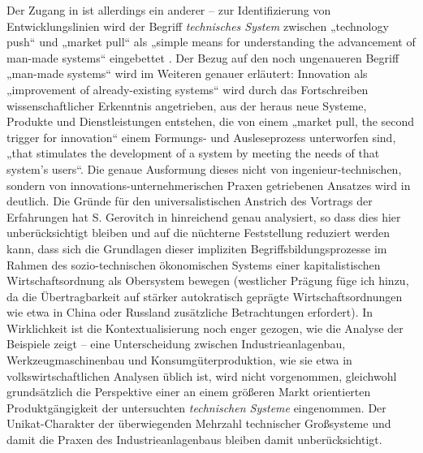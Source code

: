 \documentclass[12pt,a4paper]{article}
\begin{document}
Der Zugang in \cite{TESE2018} ist allerdings ein anderer -- zur
Identifizierung von Entwicklungslinien wird der Begriff \emph{technisches
  System} zwischen „technology push“ und „market pull“ als „simple means for
understanding the advancement of man-made systems“ eingebettet
\cite[S. 1]{TESE2018}. Der Bezug auf den noch ungenaueren Begriff „man-made
systems“ wird im Weiteren genauer erläutert: Innovation als „improvement of
already-existing systems“ wird durch das Fortschreiben wissenschaftlicher
Erkenntnis angetrieben, aus der heraus neue Systeme, Produkte und
Dienstleistungen entstehen, die von einem „market pull, the second trigger for
innovation“ einem Formungs- und Ausleseprozess unterworfen sind, „that
stimulates the development of a system by meeting the needs of that system's
users“.  Die genaue Ausformung dieses nicht von ingenieur-technischen, sondern
von innovations-unternehmerischen Praxen getriebenen Ansatzes wird in
\cite[Kap. 3]{TESE2018} deutlich.  Die Gründe für den universalistischen
Anstrich des Vortrags der Erfahrungen hat S. Gerovitch in \cite{Gerovitch1996}
hinreichend genau analysiert, so dass dies hier unberücksichtigt bleiben und
auf die nüchterne Feststellung reduziert werden kann, dass sich die Grundlagen
dieser impliziten Begriffsbildungsprozesse im Rahmen des sozio-technischen
ökonomischen Systems einer kapitalistischen Wirtschaftsordnung als Obersystem
bewegen (westlicher Prägung füge ich hinzu, da die Übertragbarkeit auf stärker
autokratisch geprägte Wirtschaftsordnungen wie etwa in China oder Russland
zusätzliche Betrachtungen erfordert).  In Wirklichkeit ist die
Kontextualisierung noch enger gezogen, wie die Analyse der Beispiele zeigt --
eine Unterscheidung zwischen Industrieanlagenbau, Werkzeugmaschinenbau und
Konsumgüterproduktion, wie sie etwa in volkswirtschaftlichen Analysen üblich
ist, wird nicht vorgenommen, gleichwohl grundsätzlich die Perspektive einer an
einem größeren Markt orientierten Produktgängigkeit der untersuchten
\emph{technischen Systeme} eingenommen.  Der Unikat-Charakter der
überwiegenden Mehrzahl technischer Großsysteme und damit die Praxen des
Industrieanlagenbaus bleiben damit unberücksichtigt.
\end{document}
